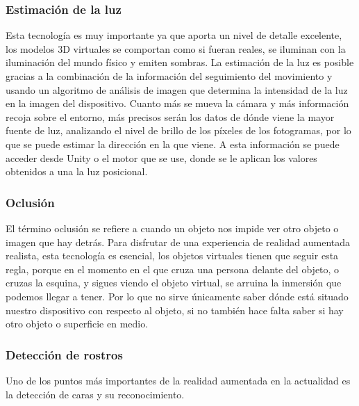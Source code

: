 \subsubsection{Estimación de la luz}
Esta tecnología es muy importante ya que aporta un nivel de detalle excelente, los modelos 3D virtuales se comportan como si fueran reales, se iluminan con la iluminación del mundo físico y emiten sombras. La estimación de la luz es posible gracias a la combinación de la información del seguimiento del movimiento y usando un algoritmo de análisis de imagen que determina la intensidad de la luz en la imagen del dispositivo. Cuanto más se mueva la cámara y más información recoja sobre el entorno, más precisos serán los datos de dónde viene la mayor fuente de luz, analizando el nivel de brillo de los píxeles de los fotogramas, por lo que se puede estimar la dirección en la que viene. A esta información se puede acceder desde Unity o el motor que se use, donde se le aplican los valores obtenidos a una la luz posicional.
\subsubsection{Oclusión}
El término oclusión se refiere a cuando un objeto nos impide ver otro objeto o imagen que hay detrás. Para disfrutar de una experiencia de realidad aumentada realista, esta tecnología es esencial, los objetos virtuales tienen que seguir esta regla, porque en el momento en el que cruza una persona delante del objeto, o cruzas la esquina, y sigues viendo el objeto virtual, se arruina la inmersión que podemos llegar a tener. Por lo que no sirve únicamente saber dónde está situado nuestro dispositivo con respecto al objeto, si no también hace falta saber si hay otro objeto o superficie en medio.\cite{articleOclusion}
\subsubsection{Detección de rostros}

Uno de los puntos más importantes de la realidad aumentada en la actualidad es la detección de caras y su reconocimiento.\\

